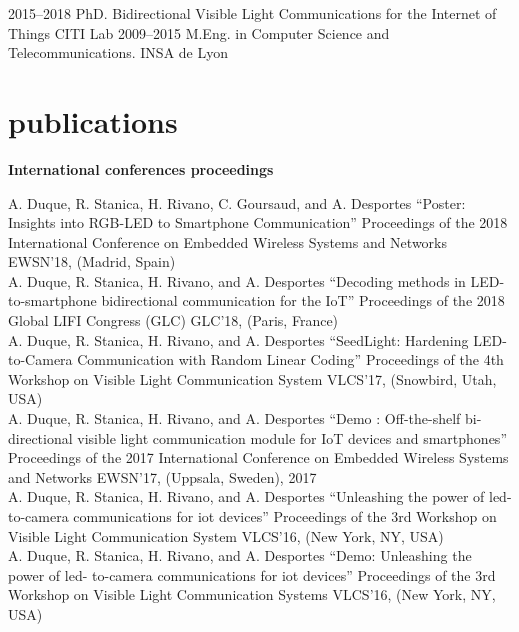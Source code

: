 \documentclass[]{cv-style}          %
\begin{document}
\begin{entrylist}
\entry
{2015--2018}
{PhD. {\normalfont Bidirectional Visible Light Communications for the Internet of Things}}
{CITI Lab}
{}
\entry
{2009--2015}
{M.Eng. {\normalfont in Computer Science and Telecommunications.}}
{INSA de Lyon}
{ \\
}
\end{entrylist}

\section{publications}
 \vspace{-0.2cm}
\large{\textbf{International conferences proceedings}}

\normalsize
\begin{publist}
\pub
{A. Duque, R. Stanica, H. Rivano, C. Goursaud, and A. Desportes}
{“Poster: Insights into RGB-LED to Smartphone Communication”}
{Proceedings of the 2018 International Conference on Embedded Wireless Systems and Networks}
{EWSN’18, (Madrid, Spain)}\\
\pub
{A. Duque, R. Stanica, H. Rivano, and A. Desportes}
{“Decoding methods in LED-to-smartphone bidirectional communication for the IoT”}
{Proceedings of the 2018 Global LIFI Congress (GLC)}
{GLC’18, (Paris, France)}\\
\pub
{A. Duque, R. Stanica, H. Rivano, and A. Desportes}
{“SeedLight: Hardening LED-to-Camera Communication with Random Linear Coding”}
{Proceedings of the 4th Workshop on Visible Light Communication System}
{VLCS’17, (Snowbird, Utah, USA)}\\
\pub
{A. Duque, R. Stanica, H. Rivano, and A. Desportes}
{“Demo : Off-the-shelf bi-directional visible light communication module for IoT devices and smartphones”}
{Proceedings of the 2017 International Conference on Embedded Wireless Systems and Networks}
{EWSN’17, (Uppsala, Sweden), 2017}\\
\pub
  {A. Duque, R. Stanica, H. Rivano, and A. Desportes}
  {“Unleashing the power of led- to-camera communications for iot devices”}
  {Proceedings of the 3rd Workshop on Visible Light Communication System}
  {VLCS’16, (New York, NY, USA)}\\
\pub
  {A. Duque, R. Stanica, H. Rivano, and A. Desportes} {“Demo: Unleashing the power of led- to-camera communications for iot devices”} {Proceedings of the 3rd Workshop on Visible Light Communication Systems} {VLCS’16, (New York, NY, USA)}

\end{publist}
\end{document}
